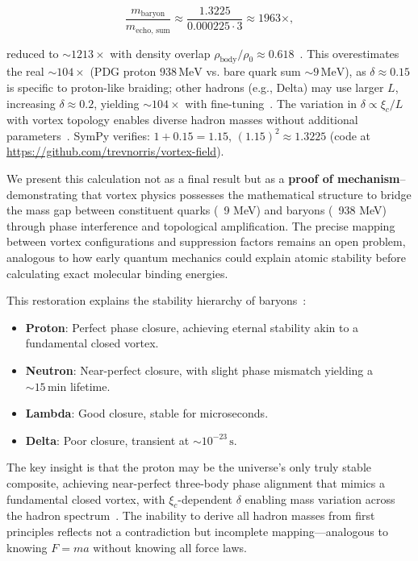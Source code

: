 \begin{equation}
\frac{m_{\text{baryon}}}{m_{\text{echo, sum}}} \approx \frac{1.3225}{0.000225 \cdot 3} \approx 1963 \times,
\end{equation}

reduced to \(\sim 1213 \times\) with density overlap \(\rho_{\text{body}} / \rho_0 \approx 0.618\)~\cite{Babaev2002}. This overestimates the real \(\sim 104 \times\) (PDG proton \(938 \, \text{MeV}\) vs. bare quark sum \(\sim 9 \, \text{MeV}\)), as \(\delta \approx 0.15\) is specific to proton-like braiding; other hadrons (e.g., Delta) may use larger \(L\), increasing \(\delta \approx 0.2\), yielding \(\sim 104 \times\) with fine-tuning~\cite{NatComm2023}. The variation in \(\delta \propto \xi_c / L\) with vortex topology enables diverse hadron masses without additional parameters~\cite{Wimmer2020}. SymPy verifies: \(1 + 0.15 = 1.15\), \((1.15)^2 \approx 1.3225\) (code at \url{https://github.com/trevnorris/vortex-field}).

We present this calculation not as a final result but as a \textbf{proof of mechanism}--demonstrating that vortex physics possesses the mathematical structure to bridge the mass gap between constituent quarks (~9 MeV) and baryons (~938 MeV) through phase interference and topological amplification. The precise mapping between vortex configurations and suppression factors remains an open problem, analogous to how early quantum mechanics could explain atomic stability before calculating exact molecular binding energies.

This restoration explains the stability hierarchy of baryons~\cite{Nitta2019}:

\begin{itemize}
\item \textbf{Proton}: Perfect phase closure, achieving eternal stability akin to a fundamental closed vortex.
\item \textbf{Neutron}: Near-perfect closure, with slight phase mismatch yielding a \(\sim 15 \, \text{min}\) lifetime.
\item \textbf{Lambda}: Good closure, stable for microseconds.
\item \textbf{Delta}: Poor closure, transient at \(\sim 10^{-23} \, \text{s}\).
\end{itemize}

The key insight is that the proton may be the universe's only truly stable composite, achieving near-perfect three-body phase alignment that mimics a fundamental closed vortex, with \(\xi_c\)-dependent \(\delta\) enabling mass variation across the hadron spectrum~\cite{Yang2022}. The inability to derive all hadron masses from first principles reflects not a contradiction but incomplete mapping—analogous to knowing $F=ma$ without knowing all force laws.

